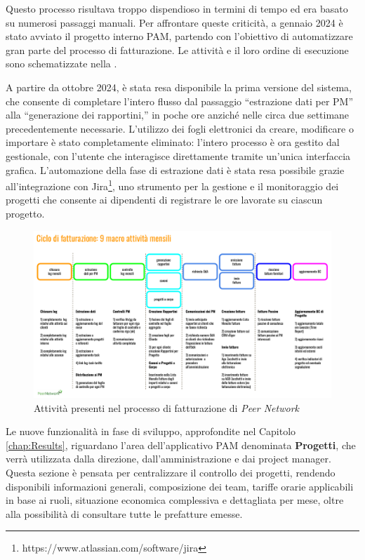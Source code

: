 Questo processo risultava troppo dispendioso in termini di tempo ed era basato su numerosi passaggi manuali. Per affrontare queste criticità, a gennaio 2024
è stato avviato il progetto interno \ac{PAM}, partendo con l’obiettivo di automatizzare gran parte del processo di fatturazione.
Le attività e il loro ordine di esecuzione sono schematizzate nella .

A partire da ottobre 2024, è stata resa disponibile la prima versione del sistema, che consente di completare l’intero flusso dal passaggio “estrazione dati
per PM” alla “generazione dei rapportini,” in poche ore anziché nelle circa due settimane precedentemente necessarie. L’utilizzo dei fogli elettronici da creare,
modificare o importare è stato completamente eliminato: l’intero processo è ora gestito dal gestionale, con l’utente che interagisce direttamente tramite un’unica
interfaccia grafica. L’automazione della fase di estrazione dati è stata resa possibile grazie all’integrazione con Jira\footnote{https://www.atlassian.com/software/jira},
uno strumento per la gestione e il monitoraggio dei progetti che consente ai dipendenti di registrare le ore lavorate su ciascun progetto.

\begin{figure}
    \centering
    \includegraphics[width=\linewidth]{figures/fasiFatturazionePN.pdf}
    \caption{Attività presenti nel processo di fatturazione di \textit{Peer Network}}
    \label{fig:fatturazione}
\end{figure}

Le nuove funzionalità in fase di sviluppo, approfondite nel Capitolo \ref{chap:Results}, riguardano l’area dell’applicativo \ac{PAM} denominata \textbf{Progetti}, che verrà
utilizzata dalla direzione, dall’amministrazione e dai project manager. Questa sezione è pensata per centralizzare il controllo dei progetti, rendendo disponibili
informazioni generali, composizione dei team, tariffe orarie applicabili in base ai ruoli, situazione economica complessiva e dettagliata per mese, oltre alla
possibilità di consultare tutte le prefatture emesse.

